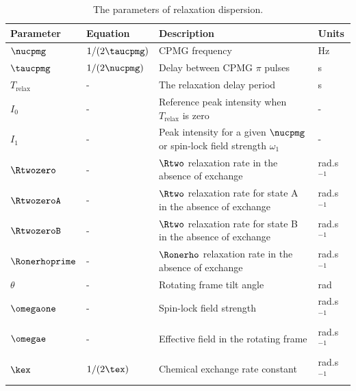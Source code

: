 \begin{table}
\begin{center}
\caption{The parameters of relaxation dispersion.}
\begin{tabular}{llll}
\toprule
Parameter               & Equation              & Description                                                                   & Units \\
\midrule
$\nucpmg$               & $1 / (2 \taucpmg)$    & CPMG frequency                                                                & Hz \\
$\taucpmg$              & $1 / (2 \nucpmg)$     & Delay between CPMG $\pi$ pulses                                               & s \\
$T_\textrm{relax}$      & -                     & The relaxation delay period                                                   & s \\
$I_0$                   & -                     & Reference peak intensity when $T_\textrm{relax}$ is zero                      & - \\
$I_1$                   & -                     & Peak intensity for a given $\nucpmg$ or spin-lock field strength $\omega_1$   & - \\
$\Rtwozero$             & -                     & $\Rtwo$ relaxation rate in the absence of exchange                            & rad.s$^{-1}$ \\
$\RtwozeroA$            & -                     & $\Rtwo$ relaxation rate for state A in the absence of exchange                & rad.s$^{-1}$ \\
$\RtwozeroB$            & -                     & $\Rtwo$ relaxation rate for state B in the absence of exchange                & rad.s$^{-1}$ \\
$\Ronerhoprime$         & -                     & $\Ronerho$ relaxation rate in the absence of exchange                         & rad.s$^{-1}$ \\
$\theta$                & -                     & Rotating frame tilt angle                                                     & rad \\
$\omegaone$             & -                     & Spin-lock field strength                                                      & rad.s$^{-1}$ \\
$\omegae$               & -                     & Effective field in the rotating frame                                         & rad.s$^{-1}$ \\
$\kex$                  & $1 / (2 \tex)$        & Chemical exchange rate constant                                               & rad.s$^{-1}$ \\

\end{tabular}
\end{center}
\end{table}
